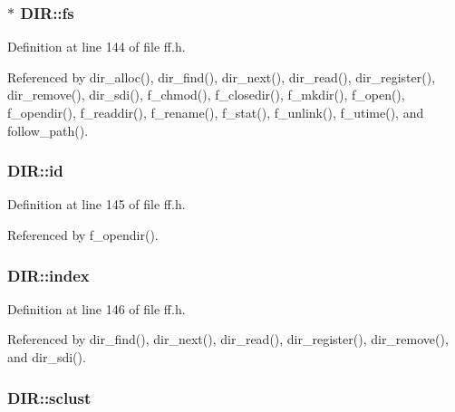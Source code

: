 \hypertarget{structDIR_a312eaa66cb703fb2993ea98173dc0c9a}{
\subsubsection[{fs}]{$\ast$ D\-I\-R\-::fs}}\label{structDIR_a312eaa66cb703fb2993ea98173dc0c9a}


Definition at line 144 of file ff.\-h.



Referenced by dir\-\_\-alloc(), dir\-\_\-find(), dir\-\_\-next(), dir\-\_\-read(), dir\-\_\-register(), dir\-\_\-remove(), dir\-\_\-sdi(), f\-\_\-chmod(), f\-\_\-closedir(), f\-\_\-mkdir(), f\-\_\-open(), f\-\_\-opendir(), f\-\_\-readdir(), f\-\_\-rename(), f\-\_\-stat(), f\-\_\-unlink(), f\-\_\-utime(), and follow\-\_\-path().

\hypertarget{structDIR_aca2c95a99a04173917ec70c030891383}{
\subsubsection[{id}]{ D\-I\-R\-::id}}\label{structDIR_aca2c95a99a04173917ec70c030891383}


Definition at line 145 of file ff.\-h.



Referenced by f\-\_\-opendir().

\hypertarget{structDIR_ab95119fbacbe45e3e9ee0f962b844092}{
\subsubsection[{index}]{ D\-I\-R\-::index}}\label{structDIR_ab95119fbacbe45e3e9ee0f962b844092}


Definition at line 146 of file ff.\-h.



Referenced by dir\-\_\-find(), dir\-\_\-next(), dir\-\_\-read(), dir\-\_\-register(), dir\-\_\-remove(), and dir\-\_\-sdi().

\hypertarget{structDIR_a9212af5877b94d790dd3bab3aa320994}{
\subsubsection[{sclust}]{ D\-I\-R\-::sclust}}\label{structDIR_a9212af5877b94d790dd3bab3aa320994}


